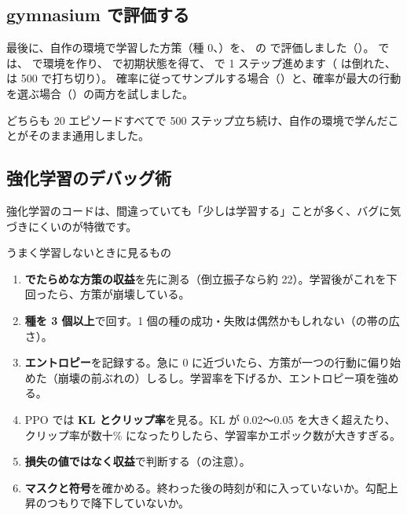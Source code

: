 \subsection*{gymnasium で評価する}

最後に、自作の環境で学習した方策（種 0、）を、 の  で評価しました（）。
 では、 で環境を作り、 で初期状態を得て、
 で 1 ステップ進めます（ は倒れた、 は 500 で打ち切り）。
確率に従ってサンプルする場合（）と、確率が最大の行動を選ぶ場合（）の両方を試しました。


どちらも 20 エピソードすべてで 500 ステップ立ち続け、自作の環境で学んだことがそのまま通用しました。

\subsection*{強化学習のデバッグ術}

強化学習のコードは、間違っていても「少しは学習する」ことが多く、バグに気づきにくいのが特徴です。

\begin{practice}{うまく学習しないときに見るもの}
\begin{enumerate}[leftmargin=1.5em]
\item \textbf{でたらめな方策の収益}を先に測る（倒立振子なら約 22）。学習後がこれを下回ったら、方策が崩壊している。
\item \textbf{種を 3 個以上}で回す。1 個の種の成功・失敗は偶然かもしれない（の帯の広さ）。
\item \textbf{エントロピー}を記録する。急に 0 に近づいたら、方策が一つの行動に偏り始めた（崩壊の前ぶれの）しるし。学習率を下げるか、エントロピー項を強める。
\item PPO では \textbf{KL とクリップ率}を見る。KL が 0.02〜0.05 を大きく超えたり、クリップ率が数十\% になったりしたら、学習率かエポック数が大きすぎる。
\item \textbf{損失の値ではなく収益}で判断する（の注意）。
\item \textbf{マスクと符号}を確かめる。終わった後の時刻が和に入っていないか。勾配上昇のつもりで降下していないか。
\end{enumerate}
\end{practice}

